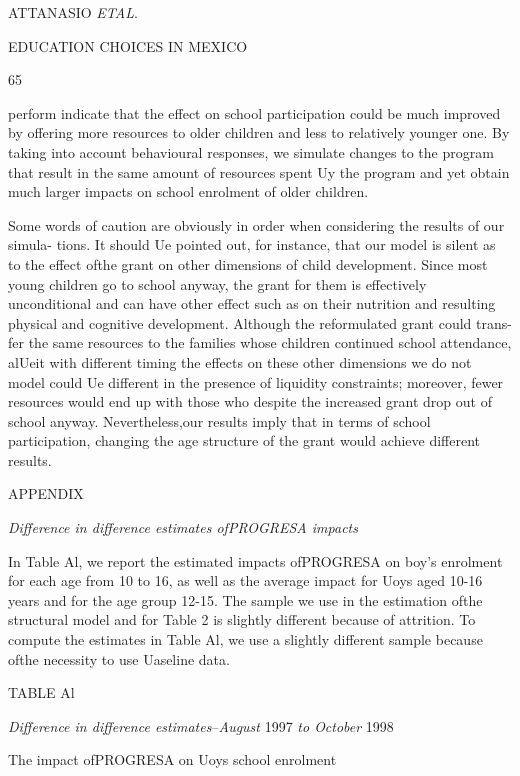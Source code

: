 ATTANASIO {\it ETAL}.

EDUCATION CHOICES IN MEXICO

65

perform indicate that the effect on school participation could be much improved by offering more resources to older children and less to relatively younger one. By taking into account behavioural responses, we simulate changes to the program that result in the same amount of resources spent Uy the program and yet obtain much larger impacts on school enrolment of older children.

Some words of caution are obviously in order when considering the results of our simula- tions. It should Ue pointed out, for instance, that our model is silent as to the effect ofthe grant on other dimensions of child development. Since most young children go to school anyway, the grant for them is effectively unconditional and can have other effect such as on their nutrition and resulting physical and cognitive development. Although the reformulated grant could trans- fer the same resources to the families whose children continued school attendance, alUeit with different timing the effects on these other dimensions we do not model could Ue different in the presence of liquidity constraints; moreover, fewer resources would end up with those who despite the increased grant drop out of school anyway. Nevertheless,our results imply that in terms of school participation, changing the age structure of the grant would achieve different results.

APPENDIX

{\it Difference in difference estimates ofPROGRESA impacts}

In Table Al, we report the estimated impacts ofPROGRESA on boy's enrolment for each age from 10 to 16, as well as the average impact for Uoys aged 10-16 years and for the age group 12-15. The sample we use in the estimation ofthe structural model and for Table 2 is slightly different because of attrition. To compute the estimates in Table Al, we use a slightly different sample because ofthe necessity to use Uaseline data.

TABLE Al

{\it Difference in difference estimates}--{\it August} 1997 {\it to October} 1998

The impact ofPROGRESA on Uoys school enrolment

